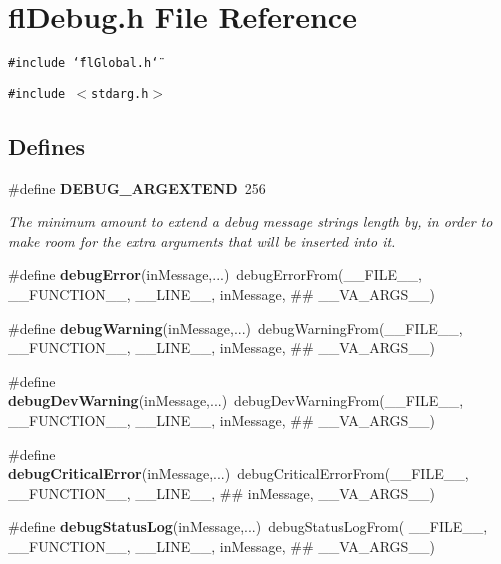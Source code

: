 \section{fl\-Debug.h File Reference}
\label{flDebug_8h}
{\tt \#include \char`\"{}fl\-Global.h\char`\"{}}\par
{\tt \#include $<$stdarg.h$>$}\par
\subsection*{Defines}
\begin{CompactItemize}
\item 
\#define {\bf DEBUG\_\-ARGEXTEND}~256
\begin{CompactList}\small\item\em The minimum amount to extend a debug message strings length by, in order to make room for the extra arguments that will be inserted into it. \item\end{CompactList}\item 
\#define {\bf debug\-Error}(in\-Message,...)~debug\-Error\-From(\_\-\_\-FILE\_\-\_\-, \_\-\_\-FUNCTION\_\-\_\-, \_\-\_\-LINE\_\-\_\-, in\-Message, \#\# \_\-\_\-VA\_\-ARGS\_\-\_\-)
\item 
\#define {\bf debug\-Warning}(in\-Message,...)~debug\-Warning\-From(\_\-\_\-FILE\_\-\_\-, \_\-\_\-FUNCTION\_\-\_\-, \_\-\_\-LINE\_\-\_\-, in\-Message, \#\# \_\-\_\-VA\_\-ARGS\_\-\_\-)
\item 
\#define {\bf debug\-Dev\-Warning}(in\-Message,...)~debug\-Dev\-Warning\-From(\_\-\_\-FILE\_\-\_\-, \_\-\_\-FUNCTION\_\-\_\-, \_\-\_\-LINE\_\-\_\-, in\-Message, \#\# \_\-\_\-VA\_\-ARGS\_\-\_\-)
\item 
\#define {\bf debug\-Critical\-Error}(in\-Message,...)~debug\-Critical\-Error\-From(\_\-\_\-FILE\_\-\_\-, \_\-\_\-FUNCTION\_\-\_\-, \_\-\_\-LINE\_\-\_\-, \#\# in\-Message, \_\-\_\-VA\_\-ARGS\_\-\_\-)
\item 
\#define {\bf debug\-Status\-Log}(in\-Message,...)~debug\-Status\-Log\-From( \_\-\_\-FILE\_\-\_\-, \_\-\_\-FUNCTION\_\-\_\-, \_\-\_\-LINE\_\-\_\-, in\-Message, \#\# \_\-\_\-VA\_\-ARGS\_\-\_\-)
\end{CompactItemize}
